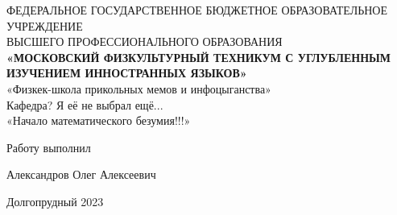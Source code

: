 \documentclass [a4paper, 12x `pt]{article}
\author{Александров Олег}
\begin{document}
\begin{titlepage}
   \begin{center}
        \hfill \break
        \footnotesize{ФЕДЕРАЛЬНОЕ ГОСУДАРСТВЕННОЕ БЮДЖЕТНОЕ ОБРАЗОВАТЕЛЬНОЕ УЧРЕЖДЕНИЕ}\\ 
        \footnotesize{ВЫСШЕГО ПРОФЕССИОНАЛЬНОГО ОБРАЗОВАНИЯ}\\
        \small{\textbf{«МОСКОВСКИЙ ФИЗКУЛЬТУРНЫЙ ТЕХНИКУМ С УГЛУБЛЕННЫМ ИЗУЧЕНИЕМ ИННОСТРАННЫХ ЯЗЫКОВ»} }\\
        \hfill \break
        \hfill \break
        \hfill \break
        \normalsize{«Физкек-школа прикольных мемов и инфоцыганства»}\\
        \hfill \break
        \hfill \break
        \hfill \break
        \normalsize{Кафедра? Я её не выбрал ещё...}\\
        \hfill\break
        \hfill \break
        \hfill \break
        \hfill \break
        \LARGE{«Начало математического безумия!!!»}\\
        \hfill \break
        \hfill \break
        \hfill \break
        \hfill \break
        \hfill \break
        \hfill \break
        \hfill \break
        \hfill \break
        \hfill \break
        \hfill \break
        \begin{center}
            \normalsize{Работу выполнил}
        \end{center}
        \begin{center}
            \normalsize{Александров Олег Алексеевич}
        \end{center}
        \hfill \break
        \normalsize{Долгопрудный 2023} 
    \end{center}
    \thispagestyle{empty}
\end{titlepage}
\end{document}
